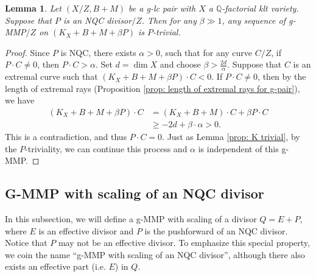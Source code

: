 \documentclass[11pt]{amsart}
\newcommand{\Qq}{\mathbb{Q}}
\newtheorem{lemma}[theorem]{Lemma}
\begin{document}
\begin{lemma}\label{prop: P trivial}
	Let $(X/Z, B+M)$ be a g-lc pair with $X$ a $\Qq$-factorial klt variety. Suppose that $P$ is an NQC divisor$/Z$. Then for any $\beta \gg 1$, any sequence of g-MMP$/Z$ on $(K_X+B+M+\beta P)$ is $P$-trivial.
\end{lemma}
\begin{proof}
	Since $P$ is NQC, there exists $\alpha>0$, such that for any curve $C/Z$, if $P\cdot C\neq 0$, then $P\cdot C>\alpha$. Set $d=\dim X$ and choose $\beta>\frac{2d}{\alpha}$. Suppose that $C$ is an extremal curve such that $(K_X+B+M+\beta P)\cdot C<0$. If $P\cdot C\neq0$, then by the length of extremal rays (Proposition \ref{prop: length of extremal rays for g-pair}), we have
	\begin{align*}
	(K_X+B+M+\beta P)\cdot C&=(K_X+B+M)\cdot C+\beta P\cdot C\\
	&\ge -2d+\beta\cdot\alpha>0.
	\end{align*}
	This is a contradiction, and thus $P\cdot C=0$.  Just as Lemma \ref{prop: K trivial}, by the $P$-triviality, we can continue this process and $\alpha$ is independent of this g-MMP. 
\end{proof}

\subsection{G-MMP with scaling of an NQC divisor}  \label{subsection: scalingnqcdiv}
In this subsection, we will define a g-MMP with scaling of a divisor $Q=E+P$, where $E$ is an effective divisor and $P$ is the pushforward of an NQC divisor. Notice that $P$ may not be an effective divisor. To emphasize this special property, we coin the name ``g-MMP with scaling of an NQC divisor'', although there also exists an effective part (i.e. $E$) in $Q$.
\end{document}
